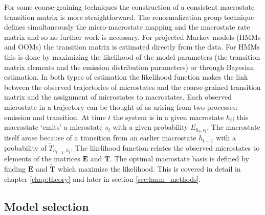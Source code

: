 For some coarse-graining techniques the construction of a consistent macrostate transition matrix is more straightforward. The renormalization group technique \cite{orioliDimensionalReductionMarkov2016c} defines simultaneously the micro-macrostate mapping and the macrostate rate matrix and so no further work is necessary. For projected Markov models (HMMs and OOMs) the transition matrix is estimated directly from the data. For HMMs this is done by maximizing the likelihood of the model parameters (the transition matrix elements and the emission distribution parameters) or through Bayesian estimation. In both types of estimation the likelihood function makes the link between the observed trajectories of microstates and the coarse-grained transition matrix and the assignment of microstates to macrostates.  Each observed microstate in a trajectory can be thought of as arising from two processes: emission and transition. At time $t$ the system is in a given macrostate $h_{t}$; this macrostate `emits' a microstate $s_{t}$ with a given probability $E_{h_{t}, s_{t}}$.  The macrostate itself arose because of a transition from an earlier macrostate $h_{t-1}$ with a probability of $\widetilde{T}_{h_{t-1}, h_{t}}$. The likelihood function relates the observed microstates to elements of the matrices  $\mathbf{E}$ and $\widetilde{\mathbf{T}}$. The optimal macrostate basis is defined by finding $\mathbf{E}$ and $\widetilde{\mathbf{T}}$ which maximize the likelihood. This is covered in detail in chapter \ref{chap:theory} and later in section \ref{sec:hmm_methods}.


\subsection{Model selection}

